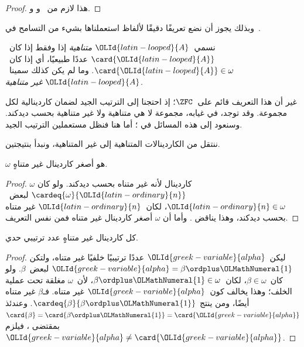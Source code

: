 \documentclass[../../../include/open-logic-section]{subfiles}
\begin{document}
\begin{proof}
هذا لازم من~
و
و.
\end{proof}

وبذلك يجوز أن نضع تعريفًا دقيقًا لألفاظ استعملناها بشيء من التسامح
في~.

\begin{defn}
نسمي~$\OLId{latin-looped}{A}$ \emph{متناهية} إذا وفقط إذا كان~$\card{\OLId{latin-looped}{A}}$ عددًا طبيعيًا،
أي إذا كان~$\card{\OLId{latin-looped}{A}} \in \omega$. وما لم يكن كذلك سمينا~$\OLId{latin-looped}{A}$
\emph{غير متناهية}.
\end{defn}
\noindent
غير أن هذا التعريف قائم على~$\ZFC$؛ إذ احتجنا إلى الترتيب الجيد
لضمان كاردينالية لكل مجموعة. وقد توجد، في غيابه، مجموعة لا هي متناهية
ولا غير متناهية بحسب ديدكند. وسنعود إلى هذه المسائل في
؛ أما هنا فنظل مستعملين الترتيب الجيد.

ننتقل من الكاردينالات المتناهية إلى غير المتناهية، ونبدأ بنتيجتين.

\begin{cor}
$\omega$ هو أصغر كاردينال غير متناهٍ.
\end{cor}

\begin{proof}
$\omega$ كاردينال لأنه غير متناه بحسب ديدكند. ولو كان
$\cardeq{\omega}{\OLId{latin-ordinary}{n}}$ لبعض~$\OLId{latin-ordinary}{n} \in \omega$، لكان~$\OLId{latin-ordinary}{n}$ غير متناه بحسب
ديدكند، وهذا يناقض
. وأما أن
$\omega$ أصغر كاردينال غير متناه فمن نفس التعريف.
\end{proof}

\begin{cor}
كل كاردينال غير متناهٍ عدد ترتيبي حدي.
\end{cor}

\begin{proof}
ليكن~$\OLId{greek-variable}{alpha}$ عددًا ترتيبيًا خلفيًا غير متناه، ولتكن
$\OLId{greek-variable}{alpha} = \beta \ordplus \OLMathNumeral{1}$ لبعض~$\beta$. ولو كان~$\beta\in\omega$،
لكان~$\beta\ordplus \OLMathNumeral{1}\in\omega$، لأن~$\omega$ مغلقة تحت عملية الخلف؛
وهذا يخالف كون~$\OLId{greek-variable}{alpha}$ غير متناه. فـ$\beta$ غير متناه أيضًا، ومن
 ينتج
$\cardeq{\beta}{\beta \ordplus \OLMathNumeral{1}}$. وعندئذ
$\card{\beta} = \card{\beta\ordplus \OLMathNumeral{1}} = \card{\OLId{greek-variable}{alpha}}$ بمقتضى
، فيلزم
$\OLId{greek-variable}{alpha} \neq \card{\OLId{greek-variable}{alpha}}$.
\end{proof}
\end{document}
